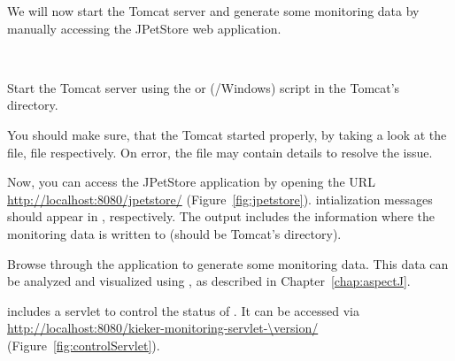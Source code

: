 \noindent We will now start the Tomcat server and generate some monitoring data by manually %
accessing the JPetStore web application. 

\

\enlargethispage{1.5cm}

\begin{compactenum}
\item Start the Tomcat server using the  or  (\UnixLikeSystems/Windows) %
   script in the Tomcat's  directory.

   You should make sure, that the Tomcat started properly, by taking 
   a look at the  file,  file respectively. %
   On error, the file  may contain details %
   to resolve the issue.
\item Now, you can access the JPetStore application by opening the URL
   \url{http://localhost:8080/jpetstore/} (Figure~\ref{fig:jpetstore}). %
   \Kieker{} intialization messages should appear in ,  respectively. %
   The output includes the information where the monitoring data is written to
   (should be Tomcat's  directory).
\item  Browse through the application to generate some monitoring data. %
   This data can be analyzed and visualized using \KiekerTraceAnalysis{}, %
   as described in Chapter~\ref{chap:aspectJ}.
\item \Kieker{} includes a servlet to control the status of \KiekerMonitoringPart{}. %
   It can be accessed via \url{http://localhost:8080/kieker-monitoring-servlet-\version/} %
   (Figure~\ref{fig:controlServlet}).
\end{compactenum}

